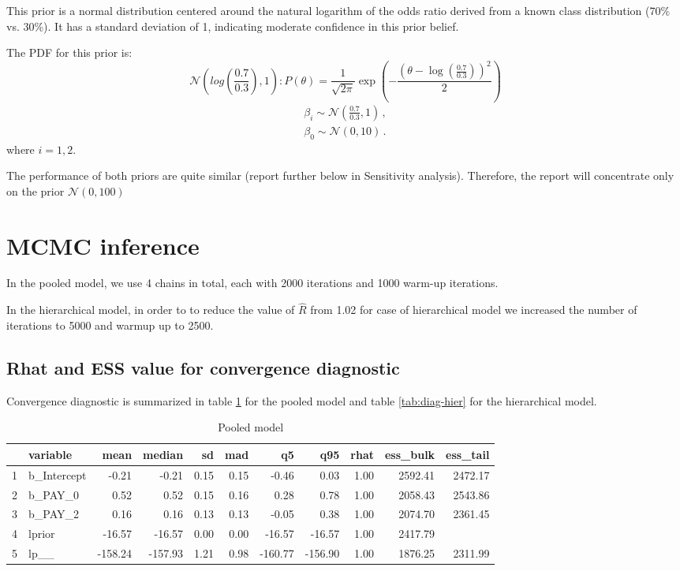 \documentclass[a4paper]{artikel3}
\begin{document}
This prior is a normal distribution centered around the natural logarithm of the odds ratio derived from a known class distribution (70\% vs. 30\%). It has a standard deviation of 1, indicating moderate confidence in this prior belief.

 
The PDF for this prior is:
\[ \mathcal{N}(log( \frac{0.7}{0.3}), 1): P(\theta) = \frac{1}{\sqrt{2\pi}} \exp\left(-\frac{(\theta - \log(\frac{0.7}{0.3}))^2}{2}\right) \]
\begin{align*}
    \beta_i \sim \mathcal{N}(\frac{0.7}{0.3},1)\,, \\
    \beta_0 \sim \mathcal{N}(0,10)\,.
\end{align*}
where $i= 1,2$.

The performance of both priors are quite similar (report further below in Sensitivity analysis). Therefore, the report will concentrate only on the prior $\mathcal{N}(0, 100)$

\section{MCMC inference}
In the pooled model, we use 4 chains in total, each with 2000 iterations  and 1000 warm-up iterations.

In the hierarchical model, in order to to reduce the value of $\hat R$ from 1.02 for case of hierarchical model we increased the number of iterations to 5000 and warmup up to 2500.  

\subsection{Rhat and ESS value for convergence diagnostic}
Convergence diagnostic is summarized in table \ref{tab:diag-pooled} for the pooled model  and table \ref{tab:diag-hier} for the hierarchical model. 
\begin{table}[ht]
\centering
\begin{tabular}{rlrrrrrrrrr}
  \hline
 & variable & mean & median & sd & mad & q5 & q95 & rhat & ess\_bulk & ess\_tail \\ 
  \hline
1 & b\_Intercept & -0.21 & -0.21 & 0.15 & 0.15 & -0.46 & 0.03 & 1.00 & 2592.41 & 2472.17 \\ 
  2 & b\_PAY\_0 & 0.52 & 0.52 & 0.15 & 0.16 & 0.28 & 0.78 & 1.00 & 2058.43 & 2543.86 \\ 
  3 & b\_PAY\_2 & 0.16 & 0.16 & 0.13 & 0.13 & -0.05 & 0.38 & 1.00 & 2074.70 & 2361.45 \\ 
  4 & lprior & -16.57 & -16.57 & 0.00 & 0.00 & -16.57 & -16.57 & 1.00 & 2417.79 &  \\ 
  5 & lp\_\_ & -158.24 & -157.93 & 1.21 & 0.98 & -160.77 & -156.90 & 1.00 & 1876.25 & 2311.99 \\ 
   \hline
\end{tabular}
\caption{Pooled model}
  \label{tab:diag-pooled}
\end{table}
\end{document}
